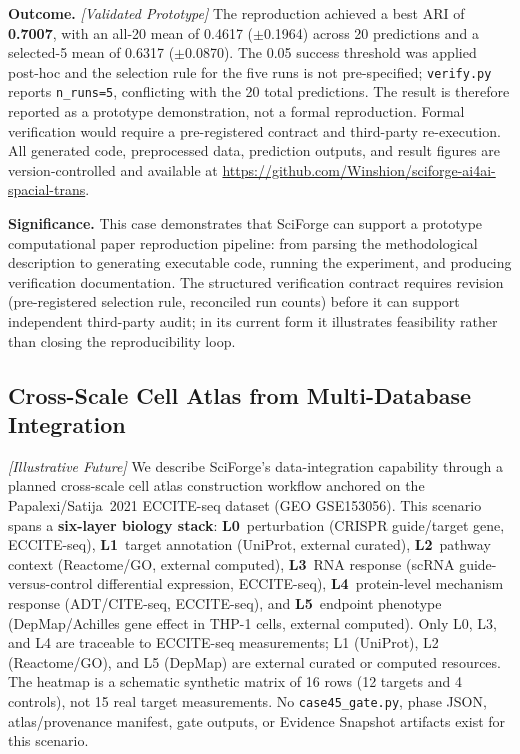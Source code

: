 \documentclass[sn-basic,Numbered,pdflatex]{sn-jnl}
\begin{document}
\textbf{Outcome.} \textit{[Validated Prototype]} The reproduction achieved a best ARI of \textbf{0.7007}, with an all-20 mean of 0.4617 ($\pm$0.1964) across 20 predictions and a selected-5 mean of 0.6317 ($\pm$0.0870). The 0.05 success threshold was applied post-hoc and the selection rule for the five runs is not pre-specified; \texttt{verify.py} reports \texttt{n\_runs=5}, conflicting with the 20 total predictions. The result is therefore reported as a prototype demonstration, not a formal reproduction. Formal verification would require a pre-registered contract and third-party re-execution. All generated code, preprocessed data, prediction outputs, and result figures are version-controlled and available at \url{https://github.com/Winshion/sciforge-ai4ai-spacial-trans}.

\textbf{Significance.} This case demonstrates that SciForge can support a prototype computational paper reproduction pipeline: from parsing the methodological description to generating executable code, running the experiment, and producing verification documentation. The structured verification contract requires revision (pre-registered selection rule, reconciled run counts) before it can support independent third-party audit; in its current form it illustrates feasibility rather than closing the reproducibility loop.

\subsection{Cross-Scale Cell Atlas from Multi-Database Integration}

\textit{[Illustrative Future]} We describe SciForge's data-integration capability through a planned cross-scale cell atlas construction workflow anchored on the Papalexi/Satija~2021 ECCITE-seq dataset (GEO GSE153056). This scenario spans a \textbf{six-layer biology stack}: \textbf{L0}~perturbation (CRISPR guide/target gene, ECCITE-seq), \textbf{L1}~target annotation (UniProt, external curated), \textbf{L2}~pathway context (Reactome/GO, external computed), \textbf{L3}~RNA response (scRNA guide-versus-control differential expression, ECCITE-seq), \textbf{L4}~protein-level mechanism response (ADT/CITE-seq, ECCITE-seq), and \textbf{L5}~endpoint phenotype (DepMap/Achilles gene effect in THP-1 cells, external computed). Only L0, L3, and L4 are traceable to ECCITE-seq measurements; L1 (UniProt), L2 (Reactome/GO), and L5 (DepMap) are external curated or computed resources. The heatmap is a schematic synthetic matrix of 16 rows (12 targets and 4 controls), not 15 real target measurements. No \texttt{case45\_gate.py}, phase JSON, atlas/provenance manifest, gate outputs, or Evidence Snapshot artifacts exist for this scenario.
\end{document}
